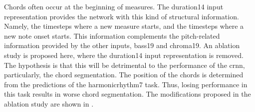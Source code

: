 
Chords often occur at the beginning of measures. The
\gls{duration14} input representation provides the network
with this kind of structural information. Namely, the
timesteps where a new measure starts, and the timesteps
where a new note onset starts. This information complements
the pitch-related information provided by the other inputs,
\gls{bass19} and \gls{chroma19}. An ablation study is
proposed here, where the \gls{duration14} input
representation is removed. The hypothesis is that this will
be detrimental to the performance of the \gls{crnn},
particularly, the chord segmentation. The position of the
chords is determined from the predictions of the
\gls{harmonicrhythm7} task. Thus, losing performance in this
task results in worse chord segmentation. The modifications
proposed in the ablation study are shown in
.

